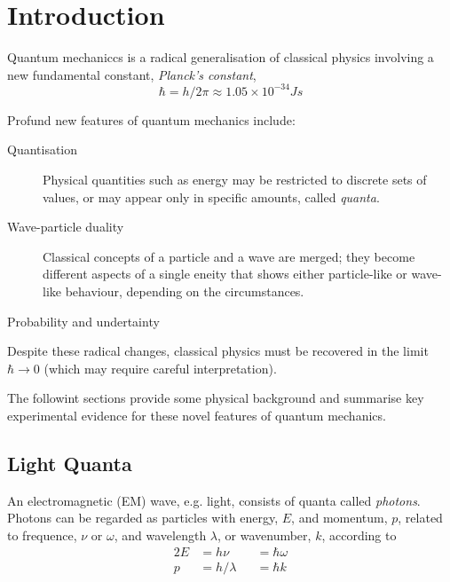 \documentclass[a4paper]{article}
\begin{document}
\maketitle

\tableofcontents

\setcounter{section}{-1}
\section{Introduction}

Quantum mechaniccs is a radical generalisation of classical physics involving a new fundamental constant, \emph{Planck's constant},
\[
  \hbar = h/2\pi \approx 1.05\times 10^{-34} Js
\]

Profund new features of quantum mechanics include:
\begin{description}
\item[Quantisation] Physical quantities such as energy may be restricted to discrete sets of values, or may appear only in specific amounts, called \emph{quanta}.
\item[Wave-particle duality] Classical concepts of a particle and a wave are merged; they become different aspects of a single eneity that shows either particle-like or wave-like behaviour, depending on the circumstances.
\item[Probability and undertainty]
\end{description}

Despite these radical changes, classical physics must be recovered in the limit $\hbar \to 0$ (which may require careful interpretation).

The followint sections provide some physical background and summarise key experimental evidence for these novel features of quantum mechanics.

\subsection{Light Quanta}

An electromagnetic (EM) wave, e.g. light, consists of quanta called \emph{photons}. Photons can be regarded as particles with energy, $E$, and momentum, $p$, related to frequence, $\nu$ or $\omega$, and wavelength $\lambda$, or wavenumber, $k$, according to
\begin{alignat*}{2}
  E &= h\nu &&= \hbar \omega \\
  p &= h/\lambda &&= \hbar k
\end{alignat*}
\end{document}
